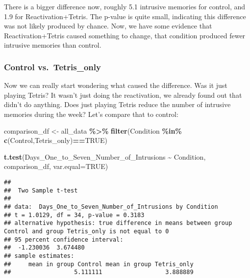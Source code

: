 \documentclass[
]{book}
\newenvironment{Shaded}{\begin{snugshade}}{\end{snugshade}}
\newcommand{\AttributeTok}[1]{\textcolor[rgb]{0.13,0.29,0.53}{#1}}
\newcommand{\ConstantTok}[1]{\textcolor[rgb]{0.56,0.35,0.01}{#1}}
\newcommand{\FunctionTok}[1]{\textcolor[rgb]{0.13,0.29,0.53}{\textbf{#1}}}
\newcommand{\NormalTok}[1]{#1}
\newcommand{\OtherTok}[1]{\textcolor[rgb]{0.56,0.35,0.01}{#1}}
\newcommand{\SpecialCharTok}[1]{\textcolor[rgb]{0.81,0.36,0.00}{\textbf{#1}}}
\newcommand{\StringTok}[1]{\textcolor[rgb]{0.31,0.60,0.02}{#1}}
\begin{document}
There is a bigger difference now, roughly 5.1 intrusive memories for control, and 1.9 for Reactivation+Tetris. The p-value is quite small, indicating this difference was not likely produced by chance. Now, we have some evidence that Reactivation+Tetris caused something to change, that condition produced fewer intrusive memories than control.

\hypertarget{control-vs.-tetris_only}{%
\subsubsection{Control vs.~Tetris\_only}\label{control-vs.-tetris_only}}

Now we can really start wondering what caused the difference. Was it just playing Tetris? It wasn't just doing the reactivation, we already found out that didn't do anything. Does just playing Tetris reduce the number of intrusive memories during the week? Let's compare that to control:

\begin{Shaded}
\begin{Highlighting}[]
\NormalTok{comparison\_df }\OtherTok{\textless{}{-}}\NormalTok{ all\_data }\SpecialCharTok{\%\textgreater{}\%} 
                  \FunctionTok{filter}\NormalTok{(Condition }\SpecialCharTok{\%in\%} \FunctionTok{c}\NormalTok{(}\StringTok{\textquotesingle{}Control\textquotesingle{}}\NormalTok{,}\StringTok{\textquotesingle{}Tetris\_only\textquotesingle{}}\NormalTok{)}\SpecialCharTok{==}\ConstantTok{TRUE}\NormalTok{)}
                        
\FunctionTok{t.test}\NormalTok{(Days\_One\_to\_Seven\_Number\_of\_Intrusions }\SpecialCharTok{\textasciitilde{}}\NormalTok{ Condition, }
\NormalTok{       comparison\_df,}
       \AttributeTok{var.equal=}\ConstantTok{TRUE}\NormalTok{)}
\end{Highlighting}
\end{Shaded}

\begin{verbatim}
## 
##  Two Sample t-test
## 
## data:  Days_One_to_Seven_Number_of_Intrusions by Condition
## t = 1.0129, df = 34, p-value = 0.3183
## alternative hypothesis: true difference in means between group Control and group Tetris_only is not equal to 0
## 95 percent confidence interval:
##  -1.230036  3.674480
## sample estimates:
##     mean in group Control mean in group Tetris_only 
##                  5.111111                  3.888889
\end{verbatim}
\end{document}

